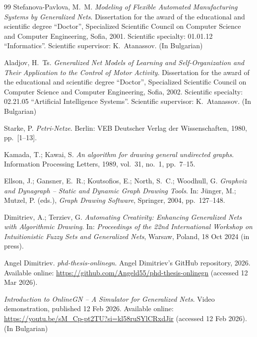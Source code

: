 \begin{thebibliography}{99}
Stefanova-Pavlova, M.~M.
\newblock \emph{Modeling of Flexible Automated Manufacturing Systems by Generalized Nets}.
\newblock Dissertation for the award of the educational and scientific degree ``Doctor'',
Specialized Scientific Council on Computer Science and Computer Engineering, Sofia, 2001.
\newblock Scientific specialty: 01.01.12 ``Informatics''.
\newblock Scientific supervisor: K.~Atanassov.
\newblock (In Bulgarian)

Aladjov, H.~Ts.
\newblock \emph{Generalized Net Models of Learning and Self-Organization and Their Application to the Control of Motor Activity}.
\newblock Dissertation for the award of the educational and scientific degree ``Doctor'',
Specialized Scientific Council on Computer Science and Computer Engineering, Sofia, 2002.
\newblock Scientific specialty: 02.21.05 ``Artificial Intelligence Systems''.
\newblock Scientific supervisor: K.~Atanassov.
\newblock (In Bulgarian)

Starke, P.
\newblock \emph{Petri-Netze}.
\newblock Berlin: VEB Deutscher Verlag der Wissenschaften, 1980, pp.~[1--13].

Kamada, T.; Kawai, S.
\newblock \emph{An algorithm for drawing general undirected graphs}.
\newblock Information Processing Letters, 1989, vol.~31, no.~1, pp.~7--15.

Ellson, J.; Gansner, E.~R.; Koutsofios, E.; North, S.~C.; Woodhull, G.
\newblock \emph{Graphviz and Dynagraph -- Static and Dynamic Graph Drawing Tools}.
\newblock In: J{\"u}nger, M.; Mutzel, P. (eds.), \emph{Graph Drawing Software}, Springer, 2004, pp.~127--148.

Dimitriev, A.; Terziev, G.
\newblock \emph{Automating Creativity: Enhancing Generalized Nets with Algorithmic Drawing}.
\newblock In: \emph{Proceedings of the 22nd International Workshop on Intuitionistic Fuzzy Sets and Generalized Nets},
Warsaw, Poland, 18 Oct 2024 (in press).

Angel Dimitriev.
\newblock \emph{phd-thesis-onlinegn}.
\newblock Angel Dimitriev's GitHub repository, 2026.
\newblock Available online: \url{https://github.com/Angeld55/phd-thesis-onlinegn} (accessed 12 Mar 2026).

\newblock \emph{Introduction to OnlineGN -- A Simulator for Generalized Nets}.
\newblock Video demonstration, published 12 Feb 2026.
\newblock Available online: \url{https://youtu.be/sM_Cp-pt2TU?si=kl58ruSYlCRxdJir} (accessed 12 Feb 2026).
\newblock (In Bulgarian)


\end{thebibliography}
